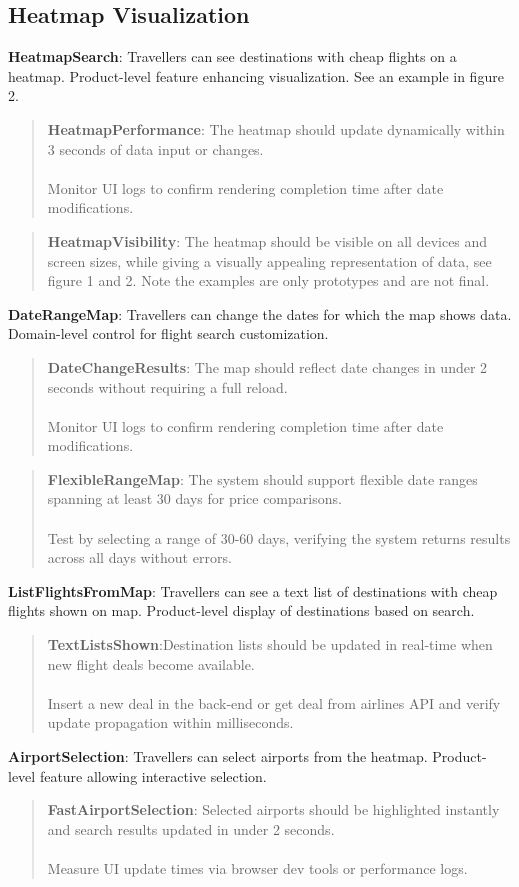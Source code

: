 \subsection{Heatmap Visualization}
\textbf{HeatmapSearch}: Travellers can see destinations with cheap flights on a heatmap.
    Product-level feature enhancing visualization. See an example in figure 2.
    \begin{quote}
        \textbf{HeatmapPerformance}: The heatmap should update dynamically within 3 seconds of data input or changes. \\ \\
        Monitor UI logs to confirm rendering completion time after date modifications.
    \end{quote}
    \begin{quote}
        \textbf{HeatmapVisibility}: The heatmap should be visible on all devices and screen sizes, while giving a visually appealing representation of data, see figure 1 and 2. Note the examples are only prototypes and are not final.
    \end{quote}
\textbf{DateRangeMap}: Travellers can change the dates for which the map shows data. Domain-level control for flight search customization.
    \begin{quote}
        \textbf{DateChangeResults}: The map should reflect date changes in under 2 seconds without requiring a full reload. \\ \\
        Monitor UI logs to confirm rendering completion time after date modifications.
    \end{quote}
\begin{quote}
    \textbf{FlexibleRangeMap}: The system should support flexible date ranges spanning at least 30 days for price comparisons. \\ \\
    Test by selecting a range of 30-60 days, verifying the system returns results across all days without errors.
\end{quote}
\textbf{ListFlightsFromMap}: Travellers can see a text list of destinations with cheap flights shown on map. Product-level display of destinations based on search.
    \begin{quote}
        \textbf{TextListsShown}:Destination lists should be updated in real-time when new flight deals become available. \\ \\
        Insert a new deal in the back-end or get deal from airlines API and verify update propagation within milliseconds.
    \end{quote}
\textbf{AirportSelection}: Travellers can select airports from the heatmap. Product-level feature allowing interactive selection.
\begin{quote}
    \textbf{FastAirportSelection}: Selected airports should be highlighted instantly and search results updated in under 2 seconds. \\ \\ 
    Measure UI update times via browser dev tools or performance logs.
\end{quote}

